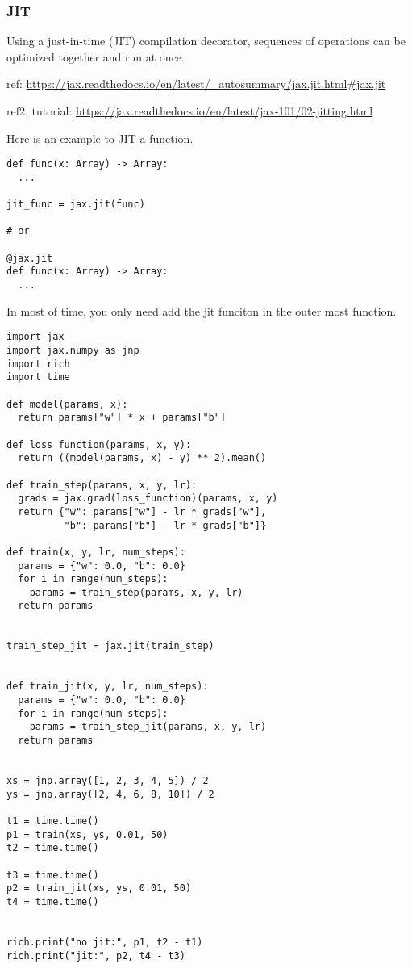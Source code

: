 \documentclass[11pt]{article}
\begin{document}
\subsubsection{JIT}
\label{sec:org35dc3f9}

Using a just-in-time (JIT) compilation decorator, sequences of operations can be optimized together and run at once.

ref: \url{https://jax.readthedocs.io/en/latest/\_autosummary/jax.jit.html\#jax.jit}

ref2, tutorial: \url{https://jax.readthedocs.io/en/latest/jax-101/02-jitting.html}

Here is an example to JIT a function.

\begin{verbatim}
def func(x: Array) -> Array:
  ...

jit_func = jax.jit(func)

# or

@jax.jit
def func(x: Array) -> Array:
  ...
\end{verbatim}

In most of time, you only need add the jit funciton in the outer most function.

\begin{verbatim}
import jax
import jax.numpy as jnp
import rich
import time

def model(params, x):
  return params["w"] * x + params["b"]

def loss_function(params, x, y):
  return ((model(params, x) - y) ** 2).mean()

def train_step(params, x, y, lr):
  grads = jax.grad(loss_function)(params, x, y)
  return {"w": params["w"] - lr * grads["w"],
          "b": params["b"] - lr * grads["b"]}

def train(x, y, lr, num_steps):
  params = {"w": 0.0, "b": 0.0}
  for i in range(num_steps):
    params = train_step(params, x, y, lr)
  return params


train_step_jit = jax.jit(train_step)


def train_jit(x, y, lr, num_steps):
  params = {"w": 0.0, "b": 0.0}
  for i in range(num_steps):
    params = train_step_jit(params, x, y, lr)
  return params


xs = jnp.array([1, 2, 3, 4, 5]) / 2
ys = jnp.array([2, 4, 6, 8, 10]) / 2

t1 = time.time()
p1 = train(xs, ys, 0.01, 50)
t2 = time.time()

t3 = time.time()
p2 = train_jit(xs, ys, 0.01, 50)
t4 = time.time()


rich.print("no jit:", p1, t2 - t1)
rich.print("jit:", p2, t4 - t3)
\end{verbatim}
\end{document}
